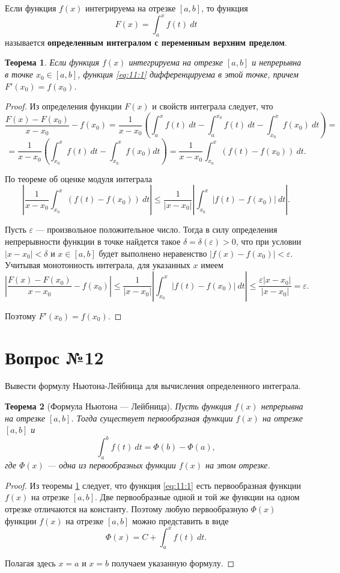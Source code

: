 \documentclass[12pt]{article}
\numberwithin{equation}{section}
\newtheorem{theorem}{Теорема}[section]
\begin{document}
Если функция $f(x)$ интегрируема на отрезке $[a,b]$, то функция
\begin{equation}
F(x) = \int_a^x f(t)~dt \label{eq:11:1} 
\end{equation}
называется \textbf{определенным интегралом с переменным верхним пределом}.
\begin{theorem}  \label{th:11:1}
 Если функция $f(x)$ интегрируема на отрезке $[a, b]$ и непрерывна в точке $x_0 \in [a,b]$, функция \ref{eq:11:1} дифференцируема в этой точке, причем $F'(x_0) = f(x_0)$.
\end{theorem}
\begin{proof}Из  определения функции $F(x)$ и свойств интеграла следует, что
\[ \frac{F(x)- F(x_0)}{x - x_0} - f(x_0) = \frac{1}{x - x_0} \left( \int_a^x f(t) ~dt - \int_a^{x_0} f(t) ~dt - \int_{x_0}^x f(x_0)~dt \right) =\]
\[ = \frac{1}{x-x_0} \left( \int_{x_0}^x f(t)~dt - \int_{x_0}^x f(x_0) dt \right) = \frac{1}{x-x_0} \int_{x_0}^x (f(t) - f(x_0))~dt.\]

По теореме об оценке модуля интеграла
\[ \left| \frac{1}{x-x_0} \int_{x_0}^x (f(t) - f(x_0))~dt \right| \leqslant \frac{1}{|x-x_0|} \left| \int_{x_0}^x |f(t) - f(x_0)| ~dt \right|.\]

Пусть $\varepsilon$ ---  произвольное положительное число. Тогда в силу определения непрерывности функции в точке найдется такое $\delta = \delta(\varepsilon) > 0$, что при условии $|x - x_0| < \delta$ и $x \in [a,b]$ будет выполнено неравенство $|f(x) - f(x_0)| < \varepsilon$. Учитывая монотонность интеграла, для указанных $x$ имеем
\[ \left| \frac{F(x) - F(x_0)}{x - x_0} - f(x_0) \right| \leqslant \frac{1}{|x - x_0|} \left| \int_{x_0}^x |f(t) - f(x_0)| ~dt\right| \leqslant \frac{\varepsilon|x-x_0|}{|x-x_0|} = \varepsilon.\]

Поэтому $F'(x_0) = f(x_0)$.
\end{proof}

\section{Вопрос №12} %
\begin{framed}
Вывести формулу Ньютона-Лейбница для вычисления определенного интеграла.
\end{framed}
\begin{theorem} [Формула Ньютона --- Лейбница]\label{th:12:1}
Пусть функция $f(x)$ непрерывна на отрезке $[a,b]$. Тогда существует первообразная функции $f(x)$ на отрезке $[a,b]$ и
\[ \int_a^b f(t)~dt = \Phi(b) - \Phi(a), \]
где $\Phi(x)$ --- одна из первообразных функции $f(x)$ на этом отрезке.
\end{theorem}
\begin{proof}
Из теоремы \ref{th:11:1} следует, что функция \ref{eq:11:1} есть первообразная функции $f(x)$ на отрезке $[a,b]$. Две первообразные одной и той же функции на одном отрезке отличаются на константу. Поэтому любую первообразную $\Phi(x)$ функции $f(x)$ на отрезке $[a,b]$ можно представить в виде
\[ \Phi(x) = C + \int_a^x f(t)~dt. \]

Полагая здесь $x = a$ и $x = b$ получаем указанную формулу.
\end{proof}
\end{document}
